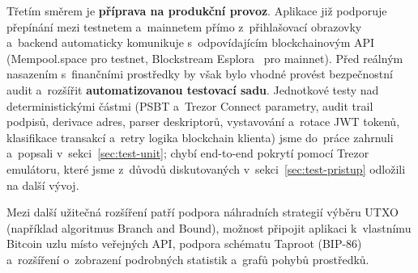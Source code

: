 Třetím směrem je \textbf{příprava na produkční provoz}. Aplikace již
podporuje přepínání mezi testnetem a~mainnetem přímo z~přihlašovací
obrazovky a~backend automaticky komunikuje s~odpovídajícím blockchainovým
API (Mempool.space pro testnet, Blockstream
Esplora~\cite{BlockstreamEsplora} pro mainnet). Před reálným nasazením
s~finančními prostředky by však bylo vhodné provést bezpečnostní audit
a~rozšířit \textbf{automatizovanou testovací sadu}. Jednotkové testy nad
deterministickými částmi (PSBT a~Trezor Connect parametry, audit trail
podpisů, derivace adres, parser deskriptorů, vystavování a~rotace JWT
tokenů, klasifikace transakcí a~retry logika blockchain klienta) jsme
do~práce zahrnuli a~popsali v~sekci~\ref{sec:test-unit}; chybí
end-to-end pokrytí pomocí Trezor emulátoru, které jsme z~důvodů
diskutovaných v~sekci~\ref{sec:test-pristup} odložili na další vývoj.

Mezi další užitečná rozšíření patří podpora náhradních strategií výběru
UTXO (například algoritmus Branch and Bound), možnost připojit aplikaci
k~vlastnímu Bitcoin uzlu místo veřejných API, podpora schématu Taproot
(BIP-86) a~rozšíření o~zobrazení podrobných statistik a~grafů pohybů
prostředků.
